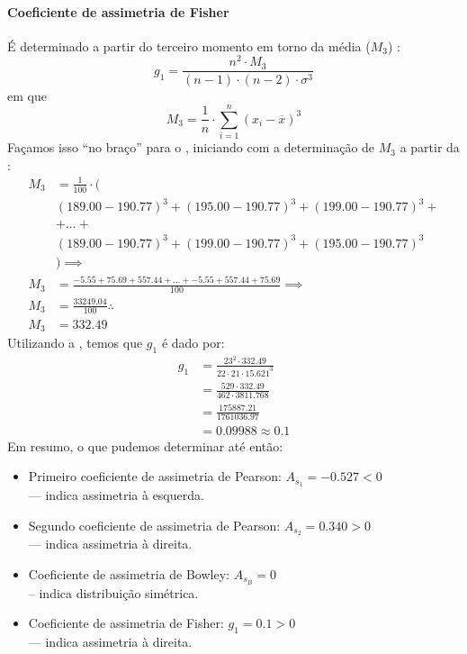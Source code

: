 \paragraph{Coeficiente de assimetria de Fisher}
É determinado a partir do terceiro momento em torno da média ($M_3$)
\parencite[p.~165]{favero}:
\begin{equation}
    g_1= \frac{n^2 \cdot M_3}{(n-1) \cdot (n-2) \cdot \sigma^3}
    \label{eq:coef-ass-fisher}
\end{equation}
em que
\begin{equation}
    M_3= \frac{1}{n} \cdot \sum_{i=1}^{n} (x_i - \overline{x})^3
    \label{eq:terceiro-momento-media}
\end{equation}
Façamos isso ``no braço'' para o , iniciando com a
determinação de $M_3$ a partir da :
\begin{align*}
    M_3 &= \frac{1}{100} \cdot \Big( \\
    &(189.00-190.77)^3 + (195.00-190.77)^3 + (199.00-190.77)^3 + \\
    &+ \ldots + \\
    &(189.00-190.77)^3 + (199.00-190.77)^3 + (195.00-190.77)^3 \\
    &\Big) \implies \\
    M_3 &= \frac{-5.55 + 75.69 + 557.44 + \ldots + -5.55 + 557.44 + 75.69}{100} \implies \\
    M_3 &= \frac{33249.04}{100} \therefore \\
    M_3 &= 332.49
\end{align*}
Utilizando a , temos que $g_1$ é dado por:
\begin{align*}
    g_1 &= \frac{23^2 \cdot 332.49}{22 \cdot 21 \cdot 15.621^3} \\
        &= \frac{529 \cdot 332.49}{462 \cdot 3811.768} \\
        &= \frac{175887.21}{1761036.97} \\
        &= 0.09988 \approx 0.1
\end{align*}
Em resumo, o que pudemos determinar até então:
\begin{itemize}
    \item Primeiro coeficiente de assimetria de Pearson:
        $A_{s_1}=-0.527<0$\\
        --- indica assimetria à esquerda.
    \item Segundo coeficiente de assimetria de Pearson:
        $A_{s_2}=0.340>0$\\
        --- indica assimetria à direita.
    \item Coeficiente de assimetria de Bowley:
        $A_{s_B}=0$\\
        -- indica distribuição simétrica.
    \item Coeficiente de assimetria de Fisher:
        $g_1=0.1>0$\\
        --- indica assimetria à direita.
\end{itemize}
